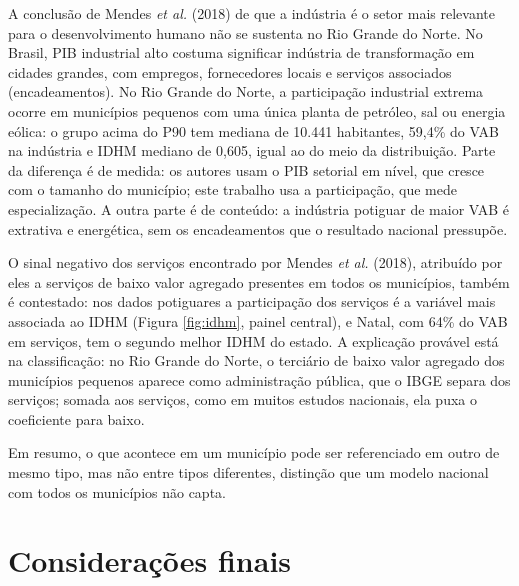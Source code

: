 \documentclass[12pt,a4paper]{article}
\begin{document}
A conclusão de Mendes \textit{et al.} (2018) de que a indústria é o setor mais relevante para o desenvolvimento humano não se sustenta no Rio Grande do Norte. No Brasil, PIB industrial alto costuma significar indústria de transformação em cidades grandes, com empregos, fornecedores locais e serviços associados (encadeamentos). No Rio Grande do Norte, a participação industrial extrema ocorre em municípios pequenos com uma única planta de petróleo, sal ou energia eólica: o grupo acima do P90 tem mediana de 10.441 habitantes, 59,4\% do VAB na indústria e IDHM mediano de 0,605, igual ao do meio da distribuição. Parte da diferença é de medida: os autores usam o PIB setorial em nível, que cresce com o tamanho do município; este trabalho usa a participação, que mede especialização. A outra parte é de conteúdo: a indústria potiguar de maior VAB é extrativa e energética, sem os encadeamentos que o resultado nacional pressupõe.

O sinal negativo dos serviços encontrado por Mendes \textit{et al.} (2018), atribuído por eles a serviços de baixo valor agregado presentes em todos os municípios, também é contestado: nos dados potiguares a participação dos serviços é a variável mais associada ao IDHM (Figura \ref{fig:idhm}, painel central), e Natal, com 64\% do VAB em serviços, tem o segundo melhor IDHM do estado. A explicação provável está na classificação: no Rio Grande do Norte, o terciário de baixo valor agregado dos municípios pequenos aparece como administração pública, que o IBGE separa dos serviços; somada aos serviços, como em muitos estudos nacionais, ela puxa o coeficiente para baixo.

Em resumo, o que acontece em um município pode ser referenciado em outro de mesmo tipo, mas não entre tipos diferentes, distinção que um modelo nacional com todos os municípios não capta.

\section{Considerações finais}
\end{document}
